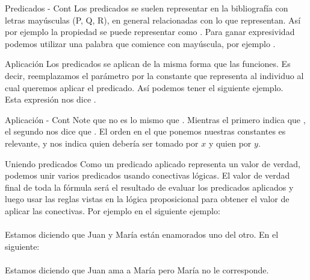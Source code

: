 
\begin{frame}{Predicados - Cont}
  Los predicados se suelen representar en la bibliografía con letras
  mayúsculas (P, Q, R), en general relacionadas con lo que representan.
  \jump
  Así por ejemplo la propiedad  se puede representar
  como .
  \jump
  Para ganar expresividad podemos utilizar una palabra que comience con mayúscula,
  por ejemplo .
\end{frame}


\begin{frame}{Aplicación}
  Los predicados se aplican de la misma forma que las funciones. Es decir,
  reemplazamos el parámetro por la constante que representa al individuo al
  cual queremos aplicar el predicado.
  \jump
  Así podemos tener el siguiente ejemplo.\\
  \jump
  Esta expresión nos dice .
\end{frame}


\begin{frame}{Aplicación - Cont}
  Note que  no es lo mismo que .
  Mientras el primero indica que ,
  el segundo nos dice que .
  \jump
  El orden en el que ponemos nuestras constantes es relevante, y nos indica quien
  debería ser tomado por $x$ y quien por $y$.
\end{frame}


\begin{frame}{Uniendo predicados}
  Como un predicado aplicado representa un valor de verdad, podemos unir varios
  predicados usando conectivas lógicas. El valor de verdad final de toda la
  fórmula será el resultado de evaluar los predicados aplicados y luego
  usar las reglas vistas en la lógica proposicional para obtener el valor de
  aplicar las conectivas.
  \jump
  Por ejemplo en el siguiente ejemplo:\\
  \\
  Estamos diciendo que Juan y María están enamorados uno del otro.
  \jump
  En el siguiente:\\
  \\
  Estamos diciendo que Juan ama a María pero María no le corresponde.
\end{frame}

